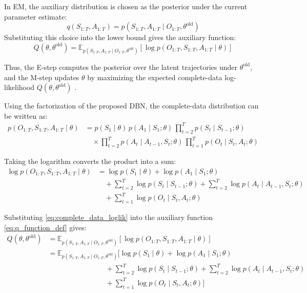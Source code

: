 In \ac{EM}, the auxiliary distribution is chosen as the posterior under the current
parameter estimate:
\begin{equation}
q(S_{1:T},A_{1:T})
=
p(S_{1:T},A_{1:T}\mid O_{1:T},\theta^{\mathrm{old}})
\label{eq:q_posterior_choice}
\end{equation}
Substituting this choice into the lower bound gives the auxiliary function:
\begin{equation}
Q(\theta,\theta^{\mathrm{old}})
=
\mathbb{E}_{p(S_{1:T},A_{1:T}\mid O_{1:T},\theta^{\mathrm{old}})}
\left[
\log p(O_{1:T},S_{1:T},A_{1:T}\mid \theta)
\right]
\label{eq:q_function_def}
\end{equation}

Thus, the E-step computes the posterior over the latent trajectories under
\(\theta^{\mathrm{old}}\), and the M-step updates \(\theta\) by maximizing the
expected complete-data log-likelihood \(Q(\theta,\theta^{\mathrm{old}})\)
\cite{Dempster1977,rabiner1989tutorial,murphy2002dynamic,pml1Book}.




Using the factorization of the proposed \ac{DBN}, the complete-data distribution can be written as:
\begin{align}
p(O_{1:T},S_{1:T},A_{1:T}\mid \theta)
&=
p(S_1\mid \theta)\,
p(A_1\mid S_1;\theta)\,
\prod_{t=2}^{T} p(S_t\mid S_{t-1};\theta)
\nonumber\\
&\quad\times
\prod_{t=2}^{T} p(A_t\mid A_{t-1},S_t;\theta)\,
\prod_{t=1}^{T} p(O_t\mid S_t,A_t;\theta)
\label{eq:complete_data_factorization}
\end{align}


Taking the logarithm converts the product into a sum:
\begin{align}
\log p(O_{1:T},S_{1:T},A_{1:T}\mid \theta)
&=
\log p(S_1\mid \theta)
+
\log p(A_1\mid S_1;\theta)
\nonumber\\
&\quad+
\sum_{t=2}^{T}\log p(S_t\mid S_{t-1};\theta)
+
\sum_{t=2}^{T}\log p(A_t\mid A_{t-1},S_t;\theta)
\nonumber\\
&\quad+
\sum_{t=1}^{T}\log p(O_t\mid S_t,A_t;\theta)
\label{eq:complete_data_loglik}
\end{align}

Substituting \eqref{eq:complete_data_loglik} into the auxiliary function
\eqref{eq:q_function_def} gives:
\begin{align}
Q(\theta,\theta^{\mathrm{old}})
&=
\mathbb{E}_{p(S_{1:T},A_{1:T}\mid O_{1:T},\theta^{\mathrm{old}})}
\left[
\log p(O_{1:T},S_{1:T},A_{1:T}\mid \theta)
\right]
\nonumber\\
&=
\mathbb{E}_{p(S_{1:T},A_{1:T}\mid O_{1:T},\theta^{\mathrm{old}})}
\Biggl[
\log p(S_1\mid \theta)
+
\log p(A_1\mid S_1;\theta)
\nonumber\\
&\qquad\qquad\qquad\qquad
+
\sum_{t=2}^{T}\log p(S_t\mid S_{t-1};\theta)
+
\sum_{t=2}^{T}\log p(A_t\mid A_{t-1},S_t;\theta)
\nonumber\\
&\qquad\qquad\qquad\qquad
+
\sum_{t=1}^{T}\log p(O_t\mid S_t,A_t;\theta)
\Biggr]
\label{eq:q_expanded_inside_expectation}
\end{align}

